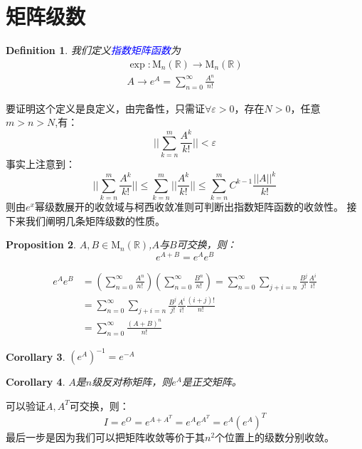 \documentclass[a4paper,12pt]{ctexart}
\newenvironment{prooff}{{\noindent\it\textcolor{cyan!40!black}{Proof}:}\quad}{\par}
\newtheorem{defn}{Definition}[section]
\newtheorem{coro}[defn]{Corollary}
\newtheorem{prop}[defn]{Proposition}
\begin{document}
\section{矩阵级数\label{section:Cayly-Hamilton}}
\begin{defn}
    我们定义\textcolor{blue}{指数矩阵函数}为\begin{align*}
        \exp : \text{M}_n(\mathbb{R})\rightarrow \text{M}_n(\mathbb{R}) \\
        A\rightarrow e^{A}=\sum_{n=0}^{\infty} \frac{A^n}{n!}
    \end{align*}
\end{defn}
要证明这个定义是良定义，由完备性，只需证$\forall \varepsilon>0$，存在$N>0$，任意$m>n>N$,有：\begin{equation*}
    ||\sum_{k=n}^{m}\frac{A^k}{k!}||<\varepsilon
\end{equation*}
事实上注意到：\begin{equation*}
    ||\sum_{k=n}^{m}\frac{A^k}{k!}||\le  \sum_{k=n}^{m}||\frac{A^k}{k!}||\le \sum_{k=n}^{m}C^{k-1}\frac{||A||^k}{k!}
\end{equation*}
则由$e^x$幂级数展开的收敛域与柯西收敛准则可判断出指数矩阵函数的收敛性。
接下来我们阐明几条矩阵级数的性质。
\begin{prop}
    \label{prop:e^{A+B}=e^{A}e^{B}}
    $A,B\in \text{M}_n(\mathbb{R})$,$A$与$B$可交换，则：\begin{equation*}
        e^{A+B}=e^Ae^B
    \end{equation*}
\end{prop}
\begin{prooff}
    \begin{align*}
        e^Ae^B & =(\sum_{n=0}^{\infty} \frac{A^n}{n!})(\sum_{n=0}^{\infty} \frac{B^n}{n!})=\sum_{n=0}^{\infty}\sum_{j+i=n}\frac{B^j}{j!} \frac{A^i}{i!} \\
               & =\sum_{n=0}^{\infty}\sum_{j+i=n}\frac{B^j}{j!}\frac{A^i}{i!}\frac{(i+j)!}{n!}                                                          \\
               & =\sum_{n=0}^{\infty} \frac{(A+B)^n}{n!}
    \end{align*}
\end{prooff}
\begin{coro}
    $(e^{A})^{-1}=e^{-A}$
\end{coro}
\begin{coro}
    $A$是$n$级反对称矩阵，则$e^{A}$是正交矩阵。
\end{coro}
\begin{prooff}
    可以验证$A,A^{T}$可交换，则：
    \begin{equation*}
        I=e^{O}=e^{A+A^{T}}=e^Ae^{A^T}=e^A(e^A)^T
    \end{equation*}
    最后一步是因为我们可以把矩阵收敛等价于其$n^2$个位置上的级数分别收敛。
\end{prooff}
\end{document}
